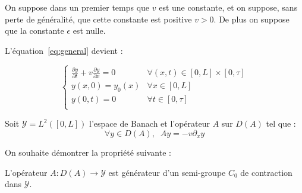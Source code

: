 \documentclass[a4paper]{article}
\begin{document}
On suppose dans un premier temps que $v$ est une constante, et on suppose,
sans perte de généralité, 
que cette constante est positive $v>0$.
De plus on suppose que la constante $\epsilon$ est nulle.

L'équation~\eqref{eq:general} devient :

\begin{equation}
\label{eq:cas0}
\begin{cases}
 \displaystyle \frac{\partial y}{\partial t}
 + v \frac{\partial y} {\partial x}  
 = 0  & \forall (x,t) \in [0,L] \times [0, \tau]\\
 y(x,0) = y_{0} (x) & \forall x \in [0,L] \\
 y(0,t) = 0 & \forall t \in [0,\tau] \\
\end{cases}
\end{equation}

Soit $\mathscr{Y} = L^2([0,L])$ l'espace de Banach et l'opérateur $A$ sur $D(A)$ tel que :
\[ \forall y \in D(A), \; \; Ay = -v \partial_x y \]

On souhaite démontrer la propriété suivante :

\begin{proposition}
	\label{prop:cas0}
	L'opérateur $A: D(A) \to \mathscr{Y}$ est générateur d'un semi-groupe $C_0$ de contraction dans $\mathscr{Y}$.
\end{proposition}
\end{document}
